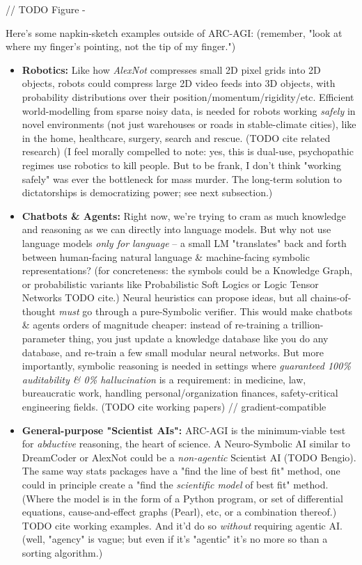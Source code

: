 \documentclass{article}
\begin{document}
// TODO Figure - 

Here's some napkin-sketch examples outside of ARC-AGI: (remember, "look at where my finger's pointing, not the tip of my finger.")

\begin{itemize}
    \item \textbf{Robotics:} Like how \textit{AlexNot} compresses small 2D pixel grids into 2D objects, robots could compress large 2D video feeds into 3D objects, with probability distributions over their position/momentum/rigidity/etc. Efficient world-modelling from sparse noisy data, is needed for robots working \textit{safely} in novel environments (not just warehouses or roads in stable-climate cities), like in the home, healthcare, surgery, search and rescue. (TODO cite related research) (I feel morally compelled to note: yes, this is dual-use, psychopathic regimes use robotics to kill people. But to be frank, I don't think "working safely" was ever the bottleneck for mass murder. The long-term solution to dictatorships is democratizing power; see next subsection.)
    \item \textbf{Chatbots \& Agents:} Right now, we're trying to cram as much knowledge and reasoning as we can directly into language models. But why not use language models \textit{only for language} -- a small LM "translates" back and forth between human-facing natural language \& machine-facing symbolic representations? (for concreteness: the symbols could be a Knowledge Graph, or probabilistic variants like Probabilistic Soft Logics or Logic Tensor Networks TODO cite.) Neural heuristics can propose ideas, but all chains-of-thought \textit{must} go through a pure-Symbolic verifier. This would make chatbots \& agents orders of magnitude cheaper: instead of re-training a trillion-parameter thing, you just update a knowledge database like you do any database, and re-train a few small modular neural networks. But more importantly, symbolic reasoning is needed in settings where \textit{guaranteed 100\% auditability \& 0\% hallucination} is a requirement: in medicine, law, bureaucratic work, handling personal/organization finances, safety-critical engineering fields. (TODO cite working papers) // gradient-compatible
    \item \textbf{General-purpose "Scientist AIs":} ARC-AGI is the minimum-viable test for \textit{abductive} reasoning, the heart of science. A Neuro-Symbolic AI similar to DreamCoder or AlexNot could be a \textit{non-agentic} Scientist AI (TODO Bengio). The same way stats packages have a "find the line of best fit" method, one could in principle create a "find the \textit{scientific model} of best fit" method. (Where the model is in the form of a Python program, or set of differential equations, cause-and-effect graphs (Pearl), etc, or a combination thereof.) TODO cite working examples. And it'd do so \textit{without} requiring agentic AI. (well, "agency" is vague; but even if it's "agentic" it's no more so than a sorting algorithm.)
\end{itemize}
\end{document}
